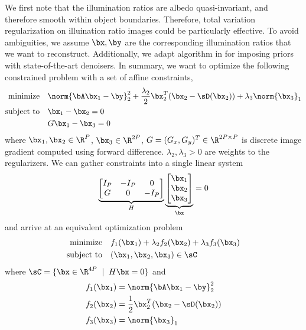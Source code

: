 \documentclass[11pt]{article}
\newcommand{\minimize}{\text{minimize}\quad}
\newcommand{\subjectto}{\text{subject to}\quad}
\begin{document}
$ $\\
We first note that the illumination ratios are albedo quasi-invariant, and therefore smooth within object boundaries. Therefore, total variation regularization on illuination ratio images could be particularly effective. To avoid ambiguities, we assume $\bx,\by$ are the corresponding illumination ratios that we want to reconstruct. Additionally, we adapt algorithm in \cite{romanoLittleEngineThat2016} for imposing priors with state-of-the-art denoisers. In summary, we want to optimize the following constrained problem with a set of affine constraints,
\begin{align*}
    \minimize  & \norm{\bA\bx_1 - \by}_2^2 + \frac{\lambda_2}{2} \bx_2^T(\bx_2 - \sD(\bx_2)) + \lambda_3 \norm{\bx_3}_1 \\
    \subjectto & \bx_1 - \bx_2 = 0 \\
               & G\bx_1 - \bx_3 = 0 \\
\end{align*}
where $\bx_1,\bx_2\in\R^{P}$, $\bx_3\in\R^{2P}$, $G = (G_{x}, G_{y})^T \in \R^{2P\times P}$ is discrete image gradient computed using forward difference. $\lambda_2,\lambda_3>0$ are weights to the regularizers. We can gather constraints into a single linear system 
\[
    \underbrace{
        \begin{bmatrix}
        I_P & -I_P & 0  \\
        G   & 0    & -I_P  \\
    \end{bmatrix}}_{H}
    \underbrace{
        \begin{bmatrix}
            \bx_1 \\ \bx_2 \\ \bx_3
        \end{bmatrix}
    }_{\bx}
    = 0
\]
and arrive at an equivalent optimization problem
\begin{equation}
    \label{eq:method_optimization_problem}
    \begin{aligned}
        \minimize  & f_1(\bx_1) + \lambda_2 f_2(\bx_2) + \lambda_3 f_3(\bx_3) \\
        \subjectto & (\bx_1,\bx_2,\bx_3) \in \sC
    \end{aligned}
\end{equation}
where $\sC = \{\bx\in\R^{4P} \;\mid\; H\bx = 0\}$ and 
\begin{align*}
    f_1(\bx_1)
        &=\norm{\bA\bx_1 - \by}_2^2 \\
    f_2(\bx_2)
        &=\frac{1}{2} \bx_2^T(\bx_2 - \sD(\bx_2)) \\
    f_3(\bx_3)
        &=\norm{\bx_3}_1
\end{align*}
\end{document}
